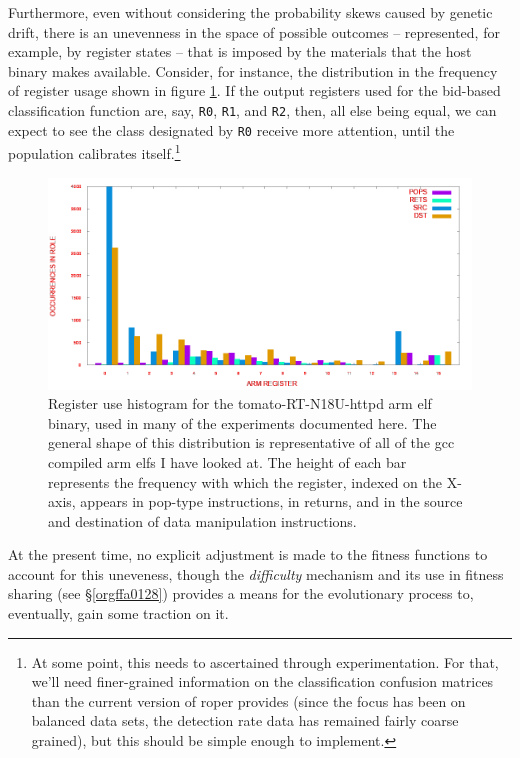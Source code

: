 \documentclass[12pt,glossary]{dalthesis}
\begin{document}
Furthermore, even without considering the probability skews caused by genetic drift,
there is an unevenness in the space of possible outcomes -- represented, for example,
by register states -- that is imposed by the materials that the host binary makes
available. Consider, for instance, the distribution in the frequency of register
usage shown in figure \ref{fig:orge07291f}. If the output registers
used for the bid-based classification function are, say, \texttt{R0}, \texttt{R1}, and \texttt{R2}, then,
all else being equal, we can expect to see the class designated by \texttt{R0} receive 
more attention, until the population calibrates itself.\footnote{At some point, this needs to ascertained through experimentation. For that, we'll
  need finer-grained information on the classification confusion matrices than the
  current version of \gls{roper} provides (since the focus has been on balanced data
  sets, the detection rate data has remained fairly coarse grained), but this should
  be simple enough to implement.}

\begin{figure}[htbp]
\centering
\includegraphics[width=.9\linewidth]{../images/plots/tomato-register-histogram.png}
\caption{\label{fig:orge07291f}
Register use histogram for the tomato-RT-N18U-httpd \gls{arm} \gls{elf} binary, used in many of the experiments documented here. The general shape of this distribution is representative of all of the \gls{gcc} compiled \gls{arm} \glspl{elf} I have looked at. The height of each bar represents the frequency with which the register, indexed on the X-axis, appears in pop-type instructions, in returns, and in the source and destination of data manipulation instructions.}
\end{figure}

At the present time, no explicit adjustment is made to the fitness functions
to account for this uneveness, though the \emph{difficulty} mechanism and its use in
fitness sharing (see \S \ref{orgffa0128}) provides a means for the evolutionary
process to, eventually, gain some traction on it.
\end{document}
